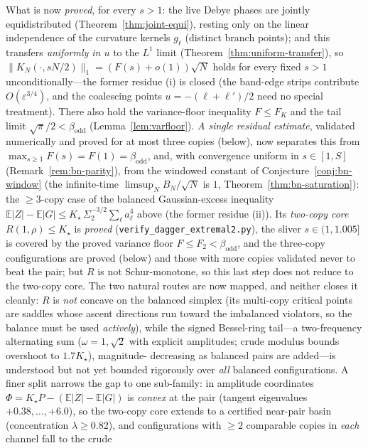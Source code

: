 \noindent What is now \emph{proved}, for every $s>1$: the live Debye phases are jointly equidistributed
(Theorem~\ref{thm:joint-equi}), resting only on the linear independence of the curvature kernels $g_\ell$
(distinct branch points); and this transfers \emph{uniformly in $u$} to the $L^1$ limit
(Theorem~\ref{thm:uniform-transfer}), so $\|K_N(\cdot,sN/2)\|_1=(F(s)+o(1))\sqrt N$ holds for every fixed $s>1$
unconditionally---the former residue (i) is closed (the band-edge strips contribute $O(\varepsilon^{3/4})$, and
the coalescing points $u=-(\ell+\ell')/2$ need no special treatment). There also hold the variance-floor inequality $F\le F_K$ and the tail limit
$\sqrt\pi/2<\beta_{\mathrm{odd}}$ (Lemma~\ref{lem:varfloor}). \emph{A single residual estimate}, validated
numerically and proved for at most three copies (below), now separates this from $\max_{s\ge1}F(s)=F(1)=\beta_{\mathrm{odd}}$, and, with convergence uniform
in $s\in[1,S]$ (Remark~\ref{rem:bn-parity}), from the windowed constant of Conjecture~\ref{conj:bn-window} (the
infinite-time $\limsup_NB_N/\sqrt N$ is $1$, Theorem~\ref{thm:bn-saturation}): the
$\ge3$-copy case of the balanced Gaussian-excess inequality $\mathbb E|Z|-\mathbb E|G|\le K_\star\,\Sigma_2^{-3/2}\sum_\ell a_\ell^4$
above (the former residue (ii)). Its \emph{two-copy core} $R(1,\rho)\le K_\star$ is \emph{proved}
(\texttt{verify\_dagger\_extremal2.py}), the sliver $s\in(1,1.005]$ is covered by the proved variance floor
$F\le F_2<\beta_{\mathrm{odd}}$, and the three-copy configurations are proved (below) and those with more copies validated never to beat
the pair; but $R$ is not Schur-monotone, so this last step does not reduce to the two-copy core. The two natural
routes are now mapped, and neither closes it cleanly: $R$ is \emph{not} concave on the balanced simplex (its
multi-copy critical points are saddles whose ascent directions run toward the imbalanced violators, so the
balance must be used \emph{actively}), while the signed Bessel-ring tail---a two-frequency alternating sum
($\omega=1,\sqrt2$ with explicit amplitudes; crude modulus bounds overshoot to $1.7K_\star$), magnitude-%
decreasing as balanced pairs are added---is understood but not yet bounded rigorously over \emph{all}
balanced configurations. A finer split narrows the gap to one sub-family: in amplitude coordinates
$\Phi=K_\star P-(\mathbb E|Z|-\mathbb E|G|)$ is \emph{convex} at the pair (tangent eigenvalues
$+0.38,\dots,+6.0$), so the two-copy core extends to a certified near-pair basin (concentration
$\lambda\ge0.82$), and configurations with $\ge2$ comparable copies in \emph{each} channel fall to the crude
